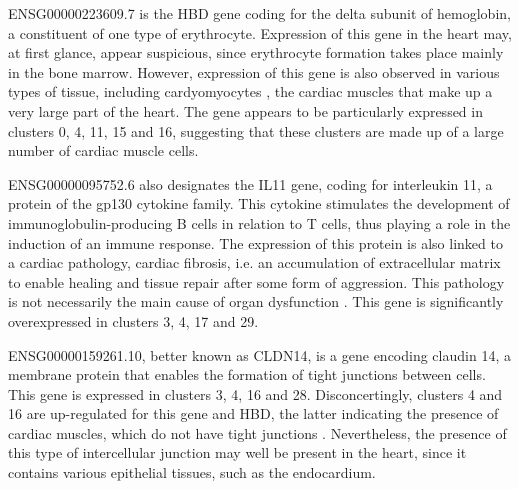 \documentclass[a4paper, 11pt]{article}
\begin{document}
\begin{multicols}{2}
ENSG00000223609.7 is the HBD gene coding for the delta subunit of hemoglobin, a constituent of one type of erythrocyte. Expression of this gene in the heart may, at first glance, appear suspicious, since erythrocyte formation takes place mainly in the bone marrow. However, expression of this gene is also observed in various types of tissue, including cardyomyocytes  \citep{Keller2022}, the cardiac muscles that make up a very large part of the heart. The gene appears to be particularly expressed in clusters 0, 4, 11, 15 and 16, suggesting that these clusters are made up of a large number of cardiac muscle cells. 

ENSG00000095752.6 also designates the IL11 gene, coding for interleukin 11, a protein of the gp130 cytokine family. This cytokine stimulates the development of immunoglobulin-producing B cells in relation to T cells, thus playing a role in the induction of an immune response. The expression of this protein is also linked to a cardiac pathology, cardiac fibrosis, i.e. an accumulation of extracellular matrix to enable healing and tissue repair after some form of aggression. This pathology is not necessarily the main cause of organ dysfunction  \citep{Sweeney2023}. This gene is significantly overexpressed in clusters 3, 4, 17 and 29.

ENSG00000159261.10, better known as CLDN14, is a gene encoding claudin 14, a membrane protein that enables the formation of tight junctions between cells. This gene is expressed in clusters 3, 4, 16 and 28. Disconcertingly, clusters 4 and 16 are up-regulated for this gene and HBD, the latter indicating the presence of cardiac muscles, which do not have tight junctions  \citep{Severs1985}. Nevertheless, the presence of this type of intercellular junction may well be present in the heart, since it contains various epithelial tissues, such as the endocardium.


\end{multicols}
\end{document}
